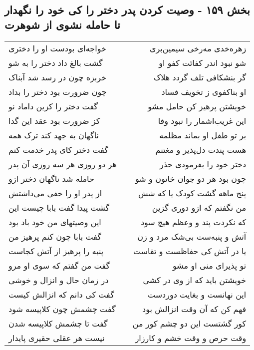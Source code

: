 \begin{center}
\section*{بخش ۱۵۹ - وصیت کردن پدر دختر را کی خود را نگهدار تا حامله نشوی از شوهرت}
\label{sec:sh159}
\begin{longtable}{l p{0.5cm} r}
خواجه‌ای بودست او را دختری
&&
زهره‌خدی مه‌رخی سیمین‌بری
\\
گشت بالغ داد دختر را به شو
&&
شو نبود اندر کفائت کفو او
\\
خربزه چون در رسد شد آبناک
&&
گر بنشکافی تلف گردد هلاک
\\
چون ضرورت بود دختر را بداد
&&
او بناکفوی ز تخویف فساد
\\
گفت دختر را کزین داماد نو
&&
خویشتن پرهیز کن حامل مشو
\\
کز ضرورت بود عقد این گدا
&&
این غریب‌اشمار را نبود وفا
\\
ناگهان به جهد کند ترک همه
&&
بر تو طفل او بماند مظلمه
\\
گفت دختر کای پدر خدمت کنم
&&
هست پندت دل‌پذیر و مغتنم
\\
هر دو روزی هر سه روزی آن پدر
&&
دختر خود را بفرمودی حذر
\\
حامله شد ناگهان دختر ازو
&&
چون بود هر دو جوان خاتون و شو
\\
از پدر او را خفی می‌داشتش
&&
پنج ماهه گشت کودک یا که شش
\\
گشت پیدا گفت بابا چیست این
&&
من نگفتم که ازو دوری گزین
\\
این وصیتهای من خود باد بود
&&
که نکردت پند و وعظم هیچ سود
\\
گفت بابا چون کنم پرهیز من
&&
آتش و پنبه‌ست بی‌شک مرد و زن
\\
پنبه را پرهیز از آتش کجاست
&&
یا در آتش کی حفاظست و تقاست
\\
گفت من گفتم که سوی او مرو
&&
تو پذیرای منی او مشو
\\
در زمان حال و انزال و خوشی
&&
خویشتن باید که از وی در کشی
\\
گفت کی دانم که انزالش کیست
&&
این نهانست و بغایت دوردست
\\
گفت چشمش چون کلاپیسه شود
&&
فهم کن که آن وقت انزالش بود
\\
گفت تا چشمش کلاپیسه شدن
&&
کور گشتست این دو چشم کور من
\\
نیست هر عقلی حقیری پایدار
&&
وقت حرص و وقت خشم و کارزار
\\
\end{longtable}
\end{center}
